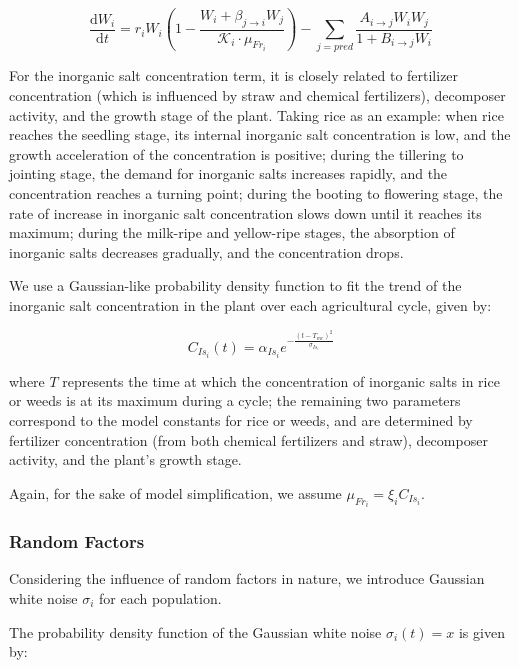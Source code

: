 \documentclass{HZNUMCM}
\begin{document}
        \[
        \frac{\mathrm{d}W_{i}}{\mathrm{d}t} = r_{i} W_{i} \left( 1 - \frac{W_{i} + \beta_{j \rightarrow i} W_{j}}{\mathscr{K}_{i} \cdot \mu_{Fr_i}} \right) - \sum_{j=pred}{\frac{A_{i\rightarrow j} W_{i} W_{j}}{1 + B_{i\rightarrow j} W_{i}}}
        \]

        For the inorganic salt concentration term, 
        it is closely related to fertilizer concentration (which is influenced by straw and chemical fertilizers), 
        decomposer activity, and the growth stage of the plant. Taking rice as an example: when rice reaches the seedling stage, 
        its internal inorganic salt concentration is low, and the growth acceleration of the concentration is positive; 
        during the tillering to jointing stage, the demand for inorganic salts increases rapidly, and the concentration reaches a turning point; 
        during the booting to flowering stage, the rate of increase in inorganic salt concentration slows down until it reaches its maximum; 
        during the milk-ripe and yellow-ripe stages, the absorption of inorganic salts decreases gradually, and the concentration drops.\cite{garcia2003logistic}
        
        We use a Gaussian-like probability density function to fit the trend of the inorganic salt concentration in the plant over each agricultural cycle, given by:
        
        \[
        C_{Is_i}(t) = \alpha_{Is_i} e^{-\frac{(t - T_{mc})^2}{\sigma_{Is_i}}}
        \]

        where \( T \) represents the time at which the concentration of inorganic salts in rice or weeds is at its maximum during a cycle; the remaining two parameters correspond to the model constants for rice or weeds, 
        and are determined by fertilizer concentration (from both chemical fertilizers and straw), decomposer activity, and the plant's growth stage.

        Again, for the sake of model simplification, we assume \( \mu_{Fr_i} = \xi_{i} C_{Is_i} \).
      \subsubsection{Random Factors}
        Considering the influence of random factors in nature, we introduce Gaussian white noise \(\sigma_i\) for each population.
        
        The probability density function of the Gaussian white noise \(\sigma_i(t) = x\) is given by:
\end{document}
